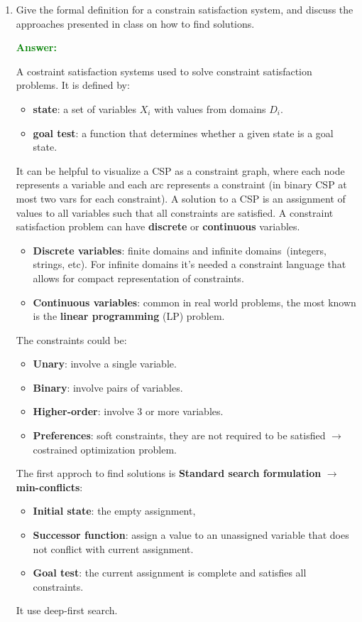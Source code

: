 \documentclass[12pt]{article}
\begin{document}
\begin{enumerate}
    \item Give the formal definition for a constrain satisfaction system, and discuss the approaches presented in class on how to find solutions.
    
    \textcolor{green}{\textbf{Answer:}}
    
    A costraint satisfaction systems used to solve constraint satisfaction problems.
    It is defined by:
    \begin{itemize}
        \item \textbf{state}: a set of variables $X_i$ with values from domains $D_i$.
        \item \textbf{goal test}: a function that determines whether a given state is a goal state.
    \end{itemize}

    It can be helpful to visualize a CSP as a constraint graph, where each node represents a variable and each arc represents a constraint (in binary CSP at most two vars for each constraint).
    A solution to a CSP is an assignment of values to all variables such that all constraints are satisfied.    
    A constraint satisfaction problem can have \textbf{discrete} or \textbf{continuous} variables.
    \begin{itemize}
        \item \textbf{Discrete variables}: finite domains and infinite domains\ (integers, strings, etc).
        For infinite domains it's needed a constraint language that allows for compact representation of constraints.
        \item \textbf{Continuous variables}: common in real world problems, the most known is the \textbf{linear programming} (LP) problem.
    \end{itemize}
    The constraints could be:
    \begin{itemize}
        \item \textbf{Unary}: involve a single variable.
        \item \textbf{Binary}: involve pairs of variables.
        \item \textbf{Higher-order}: involve 3 or more variables.
        \item \textbf{Preferences}: soft constraints, they are not required to be satisfied $\rightarrow$ costrained optimization problem.
    \end{itemize}

    The first approch to find solutions is \textbf{Standard search formulation} $\rightarrow$ \textbf{min-conflicts}:
    \begin{itemize}
        \item \textbf{Initial state}: the empty assignment, {}
        \item \textbf{Successor function}: assign a value to an unassigned variable that does not conflict with current assignment.
        \item \textbf{Goal test}: the current assignment is complete and satisfies all constraints.
    \end{itemize}
    It use deep-first search.


\end{enumerate}
\end{document}
